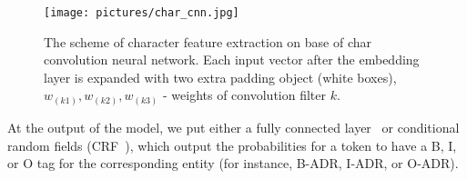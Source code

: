 \documentclass[a4paper,fleqn,longmktitle]{cas-dc}
\begin{document}
\begin{figure}
    \centering
    \texttt{[image: pictures/char\_cnn.jpg]}
    \caption{The scheme of character feature extraction on base of char convolution neural network. Each input vector after the embedding layer is expanded with two extra padding object (white boxes), $w_{(k1)}, w_{(k2)}, w_{(k3)}$ - weights of convolution filter $k$.}
    \label{fig:char_cnn}
\end{figure}
At the output of the model, we put either a fully connected layer~\cite{chiu2016named} or conditional random fields (CRF~\cite{lafferty2001conditional}), which output the probabilities for a token to have a B, I, or O tag for the corresponding entity (for instance, B-ADR, I-ADR, or O-ADR).


\end{document}
